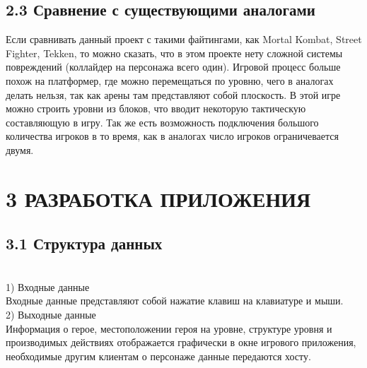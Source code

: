 \documentclass[14pt,a4paper]{extreport}
\begin{document}
	\subsection*{\normalsize\hspace{4ex}2.3 Сравнение с существующими аналогами}
\hspace{4ex} Если сравнивать данный проект с такими файтингами, как Mortal Kombat, Street Fighter, Tekken, то можно сказать, что в этом проекте нету сложной системы повреждений (коллайдер на персонажа всего один). Игровой процесс больше похож на платформер, где можно перемещаться по уровню, чего в аналогах делать нельзя, так как арены там представляют собой плоскость. В этой игре можно строить уровни из блоков, что вводит некоторую тактическую составляющую в игру. Так же есть возможность подключения большого количества игроков в то время, как в аналогах число игроков ограничевается двумя.

	\newpage
	\section*{\normalsize\hspace{4ex}3 РАЗРАБОТКА ПРИЛОЖЕНИЯ}
	\subsection*{\normalsize\hspace{4ex}3.1 Структура данных}
	\hspace{4ex}
\\1)	Входные данные
\\Входные данные представляют собой нажатие клавиш на клавиатуре и мыши. 
\\2)	Выходные данные
\\Информация о герое, местоположении героя на уровне, структуре уровня и производимых действиях отображается графически в окне игрового приложения, необходимые другим клиентам о персонаже данные передаются хосту.
\end{document}
